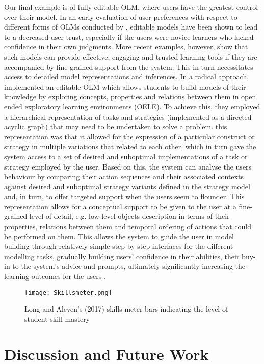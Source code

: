 \documentclass{article}
\begin{document}
Our final example is of fully editable OLM, where users have the greatest control over their model. In an early evaluation of user preferences with respect to different forms of OLMs conducted by  \cite{Mabbott}, editable models have been shown to lead to a decreased user trust, especially if the users were novice learners who lacked confidence in their own judgments. More recent examples, however, show that such models can provide effective, engaging and trusted learning tools if they are accompanied by fine-grained support from the system. This in turn necessitates access to detailed model representations and inferences. In a radical approach, ~\citep{Basu2017} implemented an editable OLM which allows students to build models of their knowledge by exploring concepts, properties and relations between them in open ended exploratory learning environments (OELE). To achieve this, they employed a hierarchical representation of tasks and strategies (implemented as a directed acyclic graph) that may need to be undertaken to solve a problem. this representation was that it allowed for the expression of a particular construct or strategy in multiple variations that related to each other, which in turn gave the system access to a set of desired and suboptimal implementations of a task or strategy employed by the user. Based on this, the system can analyse the users behaviour by comparing their action sequences and their associated contexts against desired and suboptimal strategy variants defined in the strategy model and, in turn, to offer targeted support when the users seem to flounder. This representation allows for a conceptual support to be given to the user at a fine-grained level of detail, e.g. low-level objects description in terms of their properties, relations between them and temporal ordering of actions that could be performed on them. This allows the system to guide the user in model building through relatively simple step-by-step interfaces for the different modelling tasks, gradually building users' confidence in their abilities, their buy-in to the system's advice and prompts, ultimately significantly increasing the learning outcomes for the users \cite{Basu2017}.


\begin{figure}
\centering
\texttt{[image: Skillsmeter.png]}
\caption{Long and Aleven's (2017) skills meter bars indicating the level of student skill mastery}
\label{fig:skillsmeter}
\end{figure}

\section{Discussion and Future Work}
\label{sec:conclusion}
\end{document}
